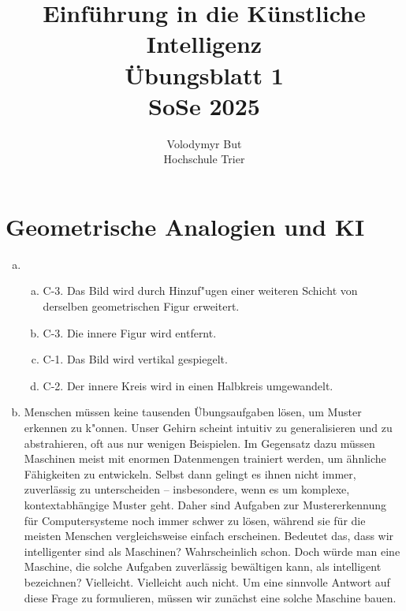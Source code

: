 \documentclass[10pt, oneside]{article}
\title{Einführung in die Künstliche Intelligenz\\[15pt]\Large{Übungsblatt 1}\\[10pt]\Large{SoSe 2025}}
\author{Volodymyr But\\[10pt]Hochschule Trier}
\date{}
\begin{document}
\maketitle
\vspace{25px}

\section{Geometrische Analogien und KI}

\begin{enumerate}[(a)]
    \item \begin{enumerate}[a)]
        \item C-3. Das Bild wird durch Hinzuf"ugen einer weiteren Schicht von
            derselben geometrischen Figur erweitert.
        \item C-3. Die innere Figur wird entfernt.
        \item C-1. Das Bild wird vertikal gespiegelt.
        \item C-2. Der innere Kreis wird in einen Halbkreis umgewandelt.
    \end{enumerate}
    \item Menschen müssen keine tausenden Übungsaufgaben lösen, um Muster
        erkennen zu k"onnen. Unser Gehirn scheint intuitiv zu generalisieren
        und zu abstrahieren, oft aus nur wenigen Beispielen. Im Gegensatz dazu
        müssen Maschinen meist mit enormen Datenmengen trainiert werden, um
        ähnliche Fähigkeiten zu entwickeln. Selbst dann gelingt es ihnen nicht
        immer, zuverlässig zu unterscheiden – insbesondere, wenn es um
        komplexe, kontextabhängige Muster geht. Daher sind Aufgaben zur
        Mustererkennung für Computersysteme noch immer schwer zu lösen, während
        sie für die meisten Menschen vergleichsweise einfach erscheinen.
        Bedeutet das, dass wir intelligenter sind als Maschinen? Wahrscheinlich
        schon. Doch würde man eine Maschine, die solche Aufgaben zuverlässig
        bewältigen kann, als intelligent bezeichnen? Vielleicht. Vielleicht
        auch nicht. Um eine sinnvolle Antwort auf diese Frage zu formulieren,
        müssen wir zunächst eine solche Maschine bauen.
\end{enumerate}
\end{document}
